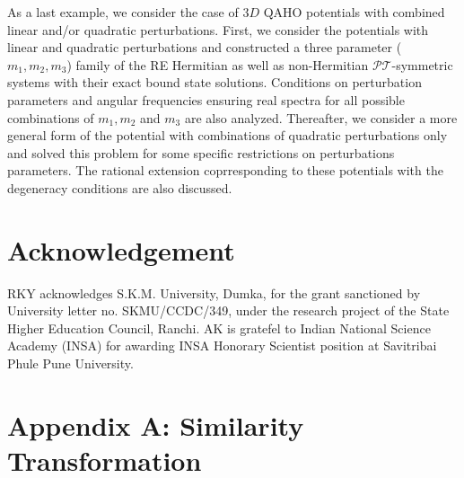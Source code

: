 \documentclass[a4paper, 12pt]{article}
\begin{document}
As a last example, we consider the case of $3D$ QAHO potentials with combined linear and/or quadratic perturbations. First, we consider the potentials with linear and quadratic perturbations and constructed a three parameter ($m_1,m_2,m_3$) family of the RE Hermitian as well as non-Hermitian  $\mathcal{PT}$-symmetric systems with their exact bound state solutions. Conditions on perturbation parameters and angular frequencies ensuring real spectra for all possible combinations of $m_1,m_2$ and $m_3$ are also analyzed. Thereafter, we consider a more general form of the potential with combinations of quadratic perturbations only and solved this problem for some specific restrictions on perturbations parameters. The rational extension coprresponding to these potentials with the degeneracy conditions are also discussed.

\section*{Acknowledgement}
RKY acknowledges S.K.M. University, Dumka, for the grant sanctioned by University letter no. SKMU/CCDC/349, under the research project of the State Higher Education Council, Ranchi. AK is gratefel to Indian National Science Academy (INSA) for awarding INSA Honorary Scientist position at Savitribai Phule Pune University.



\renewcommand{\theequation}{A.\arabic{equation}} %
\setcounter{equation}{0}

\section*{Appendix A: Similarity Transformation}
\end{document}
